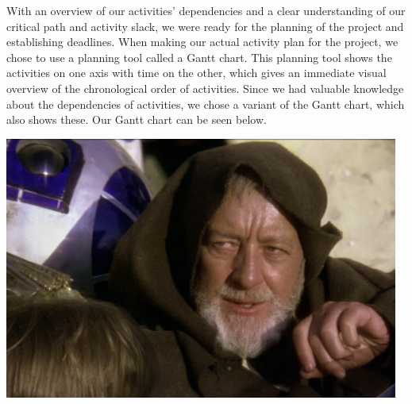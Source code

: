 With an overview of our activities’ dependencies and a clear understanding of our critical path and activity slack, we were ready for the planning of the project and establishing deadlines. 
When making our actual activity plan for the project, we chose to use a planning tool called a Gantt chart. This planning tool shows the activities on one axis with time on the other, which gives an immediate visual overview of the chronological order of activities. Since we had valuable knowledge about the dependencies of activities, we chose a variant of the Gantt chart, which also shows these.
Our Gantt chart can be seen below.  

\includegraphics[scale=0.5]{./Empiri/Planning/img/notyetmade.png}


